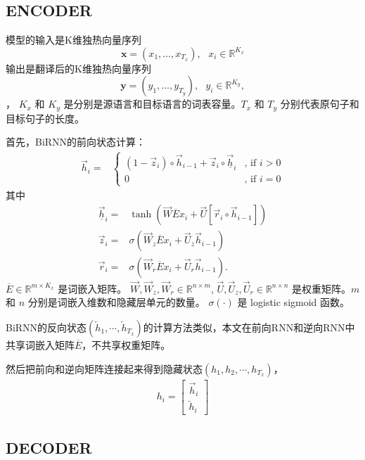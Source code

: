 \documentclass[a4paper,UTF8,no-math]{ctexart}
\newcommand{\vect}[1]{\mathbf{#1}}
\newcommand{\vx}[0]{\vect{x}}
\newcommand{\vy}[0]{\vect{y}}
\newcommand{\ola}{\overleftarrow}
\newcommand{\ora}{\overrightarrow}
\newcommand{\ov}{\overline}
\begin{document}
	\subsection{ENCODER}
	模型的输入是K维独热向量序列
	\[
	\vx = (x_1, \ldots, x_{T_x}),\mbox{ }x_i \in \mathbb{R}^{K_x}
	\]
	输出是翻译后的K维独热向量序列
	\[
	\vy = (y_1, \ldots, y_{T_y}),\mbox{ }y_i \in \mathbb{R}^{K_y},
	\]
	， $K_x$ 和 $K_y$ 是分别是源语言和目标语言的词表容量。$T_x$ 和 $T_y$ 分别代表原句子和目标句子的长度。
	
	首先，BiRNN的前向状态计算：\begin{align*}
	\ora{h}_i =& 
	\begin{cases}
	(1 - \ora{z}_i) \circ \ora{h}_{i-1}  + \ora{z}_i \circ \ora{\underline{h}}_{i} &\mbox{, if }i > 0 \\
	0 &\mbox{, if }i = 0
	\end{cases}
	\end{align*}其中\begin{align*}
	\ora{\underline{h}}_i =& \tanh \left( \ora{W} \ov{E} x_i + \ora{U}\left[ \ora{r}_i \circ \ora{h}_{i-1} \right] \right) \\
	\ora{z}_i =& \sigma\left( \ora{W}_z \ov{E} x_i + \ora{U}_z \ora{h}_{i-1} \right) \\
	\ora{r}_i =& \sigma\left( \ora{W}_r \ov{E} x_i + \ora{U}_r \ora{h}_{i-1} \right).
	\end{align*}$\overline{E} \in \mathbb{R}^{m\times K_x}$ 是词嵌入矩阵。
	$\ora{W}, \ora{W}_z, \ora{W}_r \in \mathbb{R}^{n\times m}$, $\ora{U}, \ora{U}_z,
	\ora{U}_r \in \mathbb{R}^{n\times n}$ 是权重矩阵。$m$ 和 $n$ 分别是词嵌入维数和隐藏层单元的数量。
	$\sigma(\cdot)$ 是 logistic sigmoid 函数。
	
	BiRNN的反向状态$(\ola{h}_1, \cdots, \ola{h}_{T_x})$的计算方法类似，本文在前向RNN和逆向RNN中共享词嵌入矩阵$\ov{E}$，不共享权重矩阵。
	
	然后把前向和逆向矩阵连接起来得到隐藏状态$(h_1, h_2, \cdots, h_{T_x})$，\begin{align}
	\label{eq:annotation}
	h_i = \left[ 
	\begin{array}{c}
	\ora{h}_i \\
	\ola{h}_i 
	\end{array}
	\right]
	\end{align}
	
	\subsection{DECODER}
	
\end{document}
